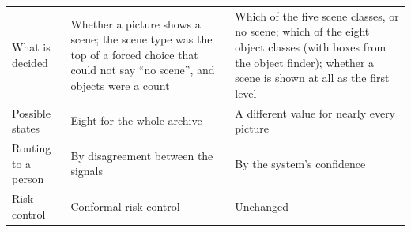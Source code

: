\begin{table}[!htbp]
\begin{tabular}{>{\raggedright\arraybackslash}p{2.6cm}>{\raggedright\arraybackslash}p{5.6cm}>{\raggedright\arraybackslash}p{5.6cm}}
What is decided & Whether a picture shows a scene; the scene type was the top of a forced choice that could not say ``no scene'', and objects were a count & Which of the five scene classes, or no scene; which of the eight object classes (with boxes from the object finder); whether a scene is shown at all as the first level \\
Possible states & Eight for the whole archive & A different value for nearly every picture \\
Routing to a person & By disagreement between the signals & By the system's confidence \\
Risk control & Conformal risk control & Unchanged \\
\bottomrule
\end{tabular}
\end{table}

